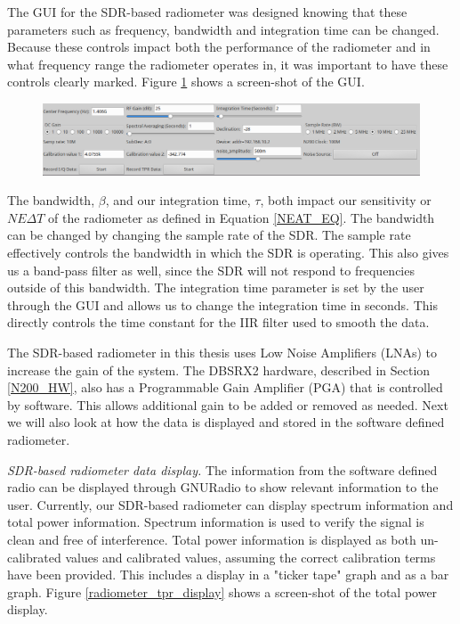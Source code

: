 The GUI for the SDR-based radiometer was designed knowing that these parameters such as frequency, bandwidth and integration time can be changed.  Because these controls impact both the performance of the radiometer and in what frequency range the radiometer operates in, it was important to have these controls clearly marked.  Figure \ref{radiometer_gui} shows a screen-shot of the GUI.

{\begin{figure}[h!tb] 
\centering
\includegraphics[width=16cm]{Images/radiometer_gui.png}
\label{radiometer_gui}
\end{figure}
}

The bandwidth, $\beta$, and our integration time, $\tau$, both impact our sensitivity or $NE\Delta T$ of the radiometer as defined in Equation \ref{NEAT_EQ}.  The bandwidth can be changed by changing the sample rate of the SDR.  The sample rate effectively controls the bandwidth in which the SDR is operating.  This also gives us a band-pass filter as well, since the SDR will not respond to frequencies outside of this bandwidth.  The integration time parameter is set by the user through the GUI and allows us to change the integration time in seconds.  This directly controls the time constant for the IIR filter used to smooth the data.

The SDR-based radiometer in this thesis uses Low Noise Amplifiers (LNAs) to increase the gain of the system.  The DBSRX2 hardware, described in Section \ref{N200_HW}, also has a Programmable Gain Amplifier (PGA) that is controlled by software.  This allows additional gain to be added or removed as needed.  Next we will also look at how the data is displayed and stored in the software defined radiometer.

\emph{SDR-based radiometer data display.}  The information from the software defined radio can be displayed through GNURadio to show relevant information to the user.  Currently, our SDR-based radiometer can display spectrum information and total power information.  Spectrum information is used to verify the signal is clean and free of interference. Total power information is displayed as both un-calibrated values and calibrated values, assuming the correct calibration terms have been provided.  This includes a display in a "ticker tape" graph and as a bar graph.  Figure \ref{radiometer_tpr_display} shows a screen-shot of the total power display.  

